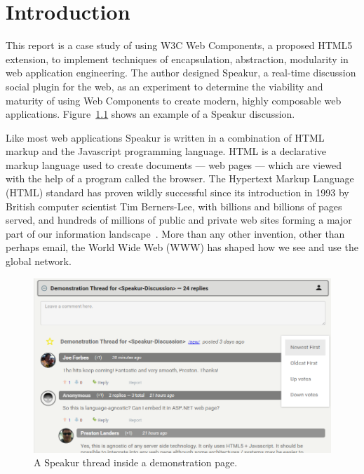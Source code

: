 \chapter{Introduction}
%
\label{ch:intro}

%
%

This report is a case study of using W3C Web Components, 
a proposed HTML5 extension,
to implement techniques of encapsulation, abstraction, modularity in web application engineering.
The author designed Speakur, a real-time discussion social plugin for the web, 
as an experiment to determine the viability and maturity of using Web Components to create modern, highly composable web applications. Figure~\ref{f:demo1} shows an example of a Speakur discussion.

Like most web applications Speakur is written in a combination of HTML markup and the Java\-script programming language. 
HTML is a declarative markup language used to create documents --- web pages --- which are viewed with the help of a program called the browser. 
The Hyper\-text Markup Language (HTML) 
standard has proven wildly successful since its introduction in 1993 by British computer scientist 
Tim Berners-Lee, 
with billions and billions of pages served, 
and hundreds of millions of public and private web sites forming a major part of our information landscape~\cite{internetlivestats.com2015}.
More than any other invention, other than perhaps email, the World Wide Web (WWW) has shaped how we see and use the global network.

\begin{figure}[htb]
\centering
 \includegraphics[width=6in]{images/screenshot_20150312_1630_v2.png}
\caption{A Speakur thread inside a demonstration page.}
\label{f:demo1}
\end{figure}

